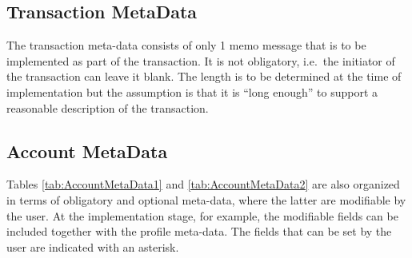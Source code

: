 \subsection{Transaction MetaData}

The transaction meta-data consists of only 1 memo message that is to be implemented as part of the transaction. It is not obligatory, i.e.\ the initiator of the transaction can leave it blank. The length is to be determined at the time of implementation but the assumption is that it is ``long enough'' to support a reasonable description of the transaction.

\newpage

\subsection{Account MetaData}
Tables \ref{tab:AccountMetaData1} and \ref{tab:AccountMetaData2} are also organized in terms of obligatory and optional meta-data, where the latter are modifiable by the user. At the implementation stage, for example, the modifiable fields can be included together with the profile meta-data. The fields that can be set by the user are indicated with an asterisk.

